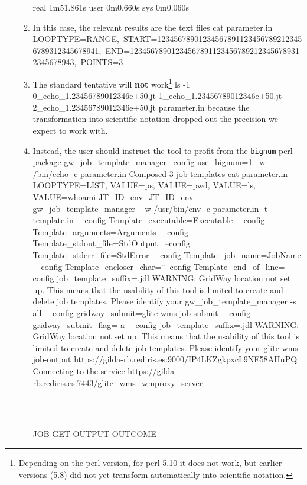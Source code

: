 \documentclass[12pt,a4paper]{article}
\newenvironment{term}{\endgraf\scriptsize\noindent\verbatim}{\endverbatim}
\begin{document}
\begin{itemize}
\begin{enumerate}
\begin{term}
\begin{term}
real    1m51.861s
user    0m0.660s
sys	    0m0.060s
\end{term}
\item In this case, the relevant results are the text files
\begin{term}
 cat parameter.in
LOOPTYPE=RANGE,\
START=123456789012345678911234567892123456789312345678941,\
  END=123456789012345678911234567892123456789312345678943,\
POINTS=3
\end{term}
\item The standard tentative will {\bf not} work\footnote{Depending on the perl version, for perl 5.10 it does not work, but earlier versions (5.8) did not yet transform automatically into scientific notation.}
\begin{term}
 ls -1
0_echo_1.23456789012346e+50.jt
1_echo_1.23456789012346e+50.jt
2_echo_1.23456789012346e+50.jt
parameter.in
\end{term}
because the transformation into scientific notation dropped out the precision we expect to work with. 
\item Instead, the user should instruct the tool to profit from the {\tt bignum} perl package
\begin{term}
 gw_job_template_manager --config use_bignum=1\
  -w /bin/echo -c parameter.in
Composed 3 job templates
 cat parameter.in
LOOPTYPE=LIST, VALUE=ps, VALUE=pwd, VALUE=ls, VALUE=whoami
{JT_ID}_env_{JT_ID}_env_ gw_job_template_manager \
-w /usr/bin/env -c parameter.in -t template.in \
--config Template_executable=Executable \
--config Template_arguments=Arguments \
--config Template_stdout_file=StdOutput \
--config Template_stderr_file=StdError \
--config Template_job_name=JobName \
--config Template_encloser_char=\" \
--config Template_end_of_line=\; \
--config job_template_suffix=.jdl
WARNING: GridWay location not set up.
This means that the usability of this tool is limited to create and delete 
job templates. Please identify your  gw_job_template_manager -s all \
--config gridway_submit=glite-wms-job-submit \
--config gridway_submit_flag=-a \
--config job_template_suffix=.jdl
WARNING: GridWay location not set up.
This means that the usability of this tool is limited to create and delete 
job templates. Please identify your  glite-wms-job-output https://gilda-rb.rediris.es:9000/IP4LKZgkpxcL9NE58AHuPQ
Connecting to the service https://gilda-rb.rediris.es:7443/glite_wms_wmproxy_server


================================================================================

			JOB GET OUTPUT OUTCOME


\end{term}
\end{term}
\end{enumerate}
\end{itemize}
\end{document}
